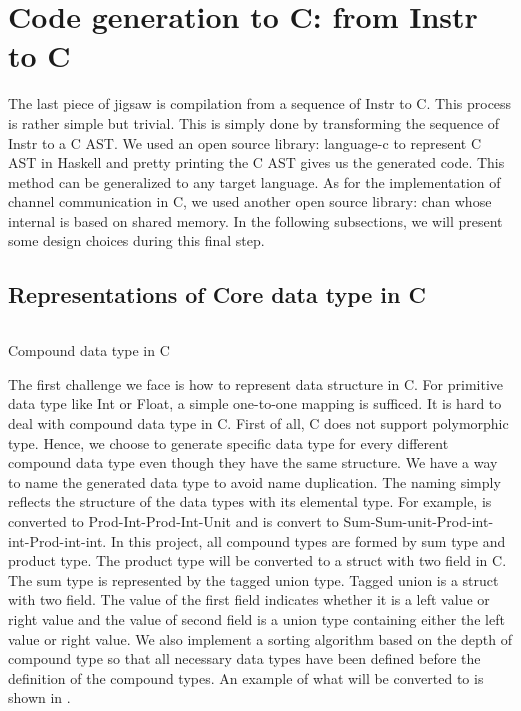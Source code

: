 \section{Code generation to C: from Instr to C}
The last piece of jigsaw is compilation from a sequence of Instr to C. This process is rather simple but trivial. This is simply done by transforming the sequence of Instr to a C AST. We used an open source library: language-c \cite{LanguagecAnalysisGeneration} to represent C AST in Haskell and pretty printing the C AST gives us the generated code. This method can be generalized to any target language. As for the implementation of channel communication in C, we used another open source library: chan \cite{treatPureImplementationGo2019} whose internal is based on shared memory. In the following subsections, we will present some design choices during this final step.
\subsection{Representations of Core data type in C}
\begin{listing}[ht]
    \inputminted{C}{codegen/data.c} 
    \caption{Compound data type in C}
    \label{codegen:code:data}
\end{listing}
The first challenge we face is how to represent data structure in C. For primitive data type like Int or Float, a simple one-to-one mapping is sufficed. It is hard to deal with compound data type in C. First of all, C does not support polymorphic type. Hence, we choose to generate specific data type for every different compound data type even though they have the same structure. We have a way to name the generated data type to avoid name duplication. The naming simply reflects the structure of the data types with its elemental type. For example,  is converted to Prod-Int-Prod-Int-Unit and  is convert to Sum-Sum-unit-Prod-int-int-Prod-int-int. In this project, all compound types are formed by sum type and product type. The product type will be converted to a struct with two field in C. The sum type is represented by the tagged union type. Tagged union is a struct with two field. The value of the first field indicates whether it is a left value or right value and the value of second field is a union type containing either the left value or right value. We also implement a sorting algorithm based on the depth of compound type so that all necessary data types have been defined before the definition of the compound types. An example of what  will be converted to is shown in .

